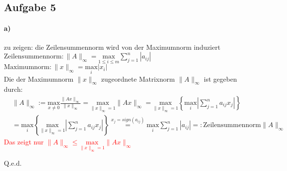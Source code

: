 \newpage
\subsection*{Aufgabe 5}
\paragraph*{a)}
zu zeigen: die Zeilensummennorm wird von der Maximumnorm induziert\\
\newline
$\mathrm{Zeilensummennorm: }\|A\|_\infty=\underset{1 \le i \le m}{\mathrm{max}} \sum_{j=1}^{n}|a_{ij}|$\\
\newline
$\mathrm{Maximumnorm: }\|x\|_\infty=\underset{i}{\mathrm{max}} |x_{i}|$\\
\newline
Die der Maximumnorm $\|x\|_\infty$ zugeordnete Matrixnorm $\|A\|_\infty$ ist gegeben durch:
\begin{align*}
&\|A\|_\infty := \underset{x\neq 0}{\mathrm{max}} \frac{\|Ax\|_\infty}{\|x\|_\infty} = 
\underset{\|x\|_\infty=1}{\mathrm{max}} \|Ax\|_\infty =
\underset{\|x\|_\infty=1}{\mathrm{max}}\left\lbrace \underset{i}{\mathrm{max}}\left|\sum_{j=1}^{n}a_{ij}x_j\right|\right\rbrace\\&=
\underset{i}{\mathrm{max}}\left\lbrace\underset{\|x\|_\infty=1}{\mathrm{max}}\left|\sum_{j=1}^{n} a_{ij}x_j\right|\right\rbrace
\overset{x_j=sign(a_{ij})}{=}\underset{i}{\mathrm{max}}\sum_{j=1}^{n}|a_{ij}|=: \mathrm{Zeilensummennorm} \|A\|_\infty
\end{align*}
\textcolor{red}{Das zeigt nur $\|A\|_\infty\le\underset{\|x\|_\infty=1}{\mathrm{max}}\|Ax\|_\infty$}
\begin{flushright}Q.e.d.\end{flushright}

